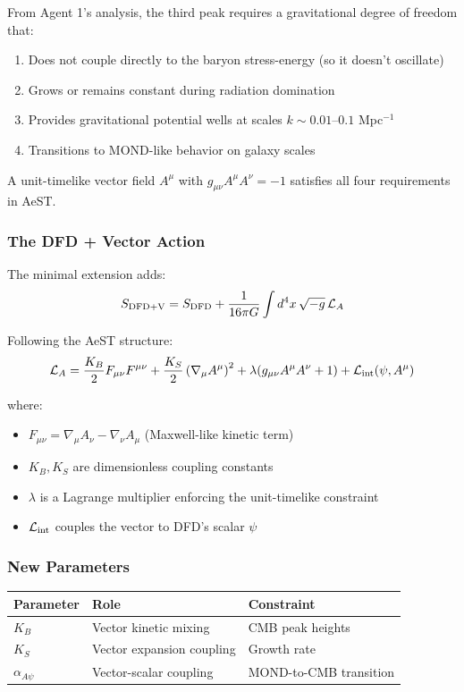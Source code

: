 \documentclass[11pt,a4paper]{article}
\begin{document}
From Agent 1's analysis, the third peak requires a gravitational degree of freedom that:
\begin{enumerate}
\item Does not couple directly to the baryon stress-energy (so it doesn't oscillate)
\item Grows or remains constant during radiation domination
\item Provides gravitational potential wells at scales $k \sim 0.01$--$0.1$ Mpc$^{-1}$
\item Transitions to MOND-like behavior on galaxy scales
\end{enumerate}

A unit-timelike vector field $A^\mu$ with $g_{\mu\nu}A^\mu A^\nu = -1$ satisfies all four requirements in AeST.

\subsubsection{The DFD + Vector Action}

The minimal extension adds:
\begin{equation}
S_{\rm DFD+V} = S_{\rm DFD} + \frac{1}{16\pi G}\int d^4x\,\sqrt{-g}\,\mathcal{L}_A
\end{equation}

Following the AeST structure:
\begin{equation}
\mathcal{L}_A = \frac{K_B}{2}F_{\mu\nu}F^{\mu\nu} + \frac{K_S}{2}\left(\nabla_\mu A^\mu\right)^2 + \lambda(g_{\mu\nu}A^\mu A^\nu + 1) + \mathcal{L}_{\rm int}(\psi, A^\mu)
\end{equation}

where:
\begin{itemize}
\item $F_{\mu\nu} = \nabla_\mu A_\nu - \nabla_\nu A_\mu$ (Maxwell-like kinetic term)
\item $K_B, K_S$ are dimensionless coupling constants
\item $\lambda$ is a Lagrange multiplier enforcing the unit-timelike constraint
\item $\mathcal{L}_{\rm int}$ couples the vector to DFD's scalar $\psi$
\end{itemize}

\subsubsection{New Parameters}

\begin{center}
\begin{tabular}{lll}
\toprule
\textbf{Parameter} & \textbf{Role} & \textbf{Constraint} \\
\midrule
$K_B$ & Vector kinetic mixing & CMB peak heights \\
$K_S$ & Vector expansion coupling & Growth rate \\
$\alpha_{A\psi}$ & Vector-scalar coupling & MOND-to-CMB transition \\
\bottomrule
\end{tabular}
\end{center}
\end{document}
